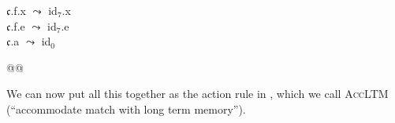 \begin{ex}
\begin{subex}
\item  $\mathfrak{c}$.f.x $\leadsto$ id$_7$.x\\
       $\mathfrak{c}$.f.e $\leadsto$ id$_7$.e\\
       $\mathfrak{c}$.a $\leadsto$ id$_0$

     \item {} 
 
\end{subex} 
   
\end{ex} 

@@
 
We can now put all this together as the action rule in \nexteg{},
which we call \textsc{AccLTM} (``accommodate match with long term
memory'').  

